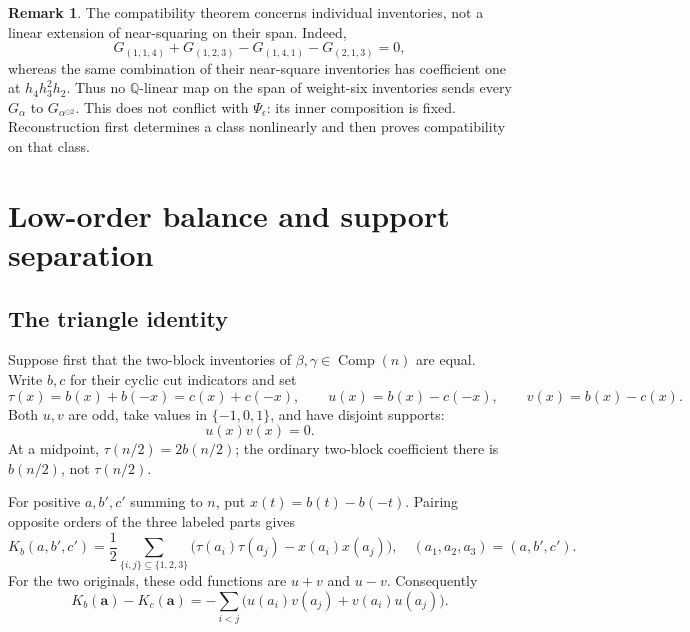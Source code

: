 \documentclass[11pt,a4paper]{amsart}
\numberwithin{equation}{section}
\theoremstyle{plain}
\theoremstyle{definition}
\newtheorem{remark}[theorem]{Remark}
\newcommand{\Q}{\mathbb Q}
\newcommand{\Comp}{\operatorname{Comp}}
\begin{document}
\begin{remark}\label{rem:nonlinear}
The compatibility theorem concerns individual inventories, not a linear
extension of near-squaring on their span.  Indeed,
\[
G_{(1,1,4)}+G_{(1,2,3)}-G_{(1,4,1)}-G_{(2,1,3)}=0,
\]
whereas the same combination of their near-square inventories has
coefficient one at \(h_4h_3^2h_2\).  Thus no \(\Q\)-linear map on the span of
weight-six inventories sends every \(G_\alpha\) to \(G_{\alpha^{\odot2}}\).
This does not conflict with \(\Psi_\epsilon\): its inner composition is fixed.
Reconstruction first determines a class nonlinearly and then proves
compatibility on that class.
\end{remark}

\section{Low-order balance and support separation}\label{sec:balance}

\subsection{The triangle identity}
Suppose first that the two-block inventories of \(\beta,\gamma\in\Comp(n)\)
are equal.  Write \(b,c\) for their cyclic cut indicators and set
\begin{equation}\label{eq:uv}
\tau(x)=b(x)+b(-x)=c(x)+c(-x),\qquad
u(x)=b(x)-c(-x),\qquad v(x)=b(x)-c(x).
\end{equation}
Both \(u,v\) are odd, take values in \(\{-1,0,1\}\), and have disjoint supports:
\[
u(x)v(x)=0.
\]
At a midpoint, \(\tau(n/2)=2b(n/2)\); the ordinary two-block coefficient
there is \(b(n/2)\), not \(\tau(n/2)\).

For positive \(a,b',c'\) summing to \(n\), put
\(x(t)=b(t)-b(-t)\).  Pairing opposite orders of the three labeled parts gives
\[
K_b(a,b',c')=\frac12\sum_{\{i,j\}\subseteq\{1,2,3\}}
\bigl(\tau(a_i)\tau(a_j)-x(a_i)x(a_j)\bigr),
\quad(a_1,a_2,a_3)=(a,b',c').
\]
For the two originals, these odd functions are \(u+v\) and \(u-v\).
Consequently
\begin{equation}\label{eq:three-difference}
K_b(\mathbf a)-K_c(\mathbf a)
=-\sum_{i<j}\bigl(u(a_i)v(a_j)+v(a_i)u(a_j)\bigr).
\end{equation}
\end{document}
